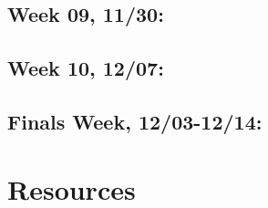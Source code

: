 \documentclass[11pt,]{article}
\begin{document}
\subsection{Week 09, 11/30:}\label{week-09-1130}

\subsection{Week 10, 12/07:}\label{week-10-1207}

\subsection{Finals Week, 12/03-12/14:}\label{finals-week-1203-1214}

\section{Resources}\label{resources}
\end{document}
